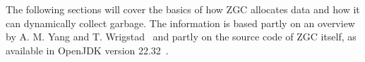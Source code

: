 
The following sections will cover the basics of how ZGC allocates data and how it can dynamically collect garbage. The information is based partly on an overview by A. M. Yang and T. Wrigstad~\cite{zgc:deep_dive} and partly on the source code of ZGC itself, as available in OpenJDK version 22.32~\cite{jdk:tag2232}.

